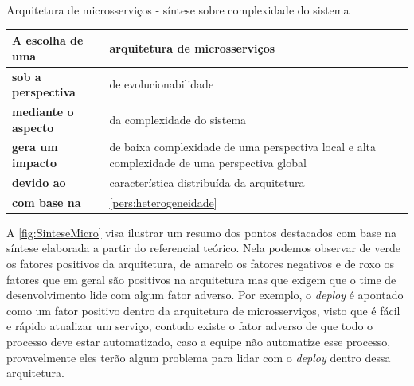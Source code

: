 \begin{quadro}
    \caption{Arquitetura de microsserviços - síntese sobre complexidade do sistema\label{microsservicos:sintese-complexidade}}
    \begin{tabularx}{\linewidth}{ | p{5cm} | X | }
    \hline
    \textbf{A escolha de uma}       & arquitetura de microsserviços \\ \hline
    \textbf{sob a perspectiva}      & de evolucionabilidade \\ \hline
    \textbf{mediante o aspecto}     & da complexidade do sistema \\ \hline
    \textbf{gera um impacto}        & de baixa complexidade de uma perspectiva local e alta
        complexidade de uma perspectiva global\\ \hline
    \textbf{devido ao}              & característica distribuída da arquitetura \\ \hline
    \textbf{com base na}            & \autoref{pers:heterogeneidade} \\ \hline
    \end{tabularx}
\end{quadro}

\newpage

A \autoref{fig:SinteseMicro} visa ilustrar um resumo dos pontos destacados com base na síntese
elaborada a partir do referencial teórico. Nela podemos observar de verde os fatores positivos da
arquitetura, de amarelo os fatores negativos e de roxo os fatores que em geral são positivos na
arquitetura mas que exigem que o time de desenvolvimento lide com algum fator adverso. Por exemplo,
o \textit{deploy} é apontado como um fator positivo dentro da arquitetura de microsserviços, visto
que é fácil e rápido atualizar um serviço, contudo existe o fator adverso de que todo o processo
deve estar automatizado, caso a equipe não automatize esse processo, provavelmente eles terão algum
problema para lidar com o \textit{deploy} dentro dessa arquitetura.


